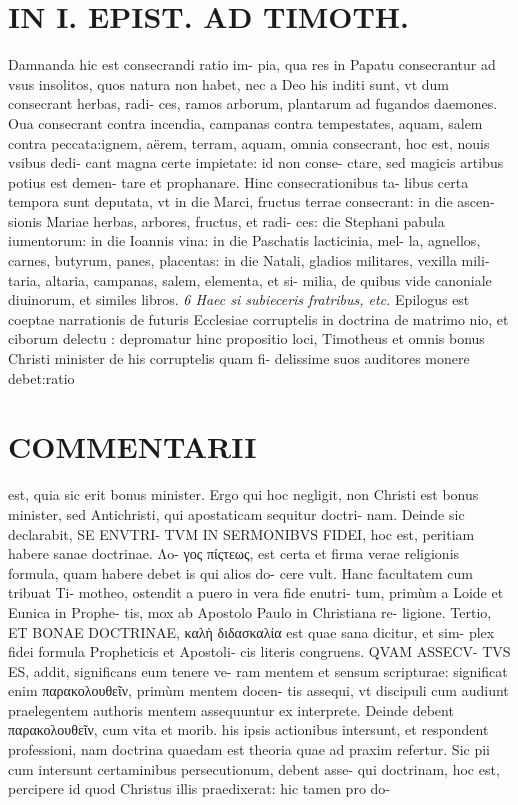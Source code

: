 \documentclass{article}
\begin{document}
\begin{pages}
\section*{IN I. EPIST. AD TIMOTH. }
\marginpar{[ p.93 ]}\pstart Damnanda hic est consecrandi ratio im- pia, qua res in Papatu consecrantur ad vsus insolitos, quos natura non habet, nec a Deo his inditi sunt, vt dum consecrant herbas, radi- ces, ramos arborum, plantarum ad fugandos daemones. Oua consecrant contra incendia, campanas contra tempestates, aquam, salem contra peccata:ignem, aërem, terram, aquam, omnia consecrant, hoc est, nouis vsibus dedi- cant magna certe impietate: id non conse- ctare, sed magicis artibus potius est demen- tare et prophanare. Hinc consecrationibus ta- libus certa tempora sunt deputata, vt in die Marci, fructus terrae consecrant: in die ascen- sionis Mariae herbas, arbores, fructus, et radi- ces: die Stephani pabula iumentorum: in die Ioannis vina: in die Paschatis lacticinia, mel- la, agnellos, carnes, butyrum, panes, placentas: in die Natali, gladios militares, vexilla mili- taria, altaria, campanas, salem, elementa, et si- milia, de quibus vide canoniale diuinorum, et similes libros.  \pend
\textit{6 Haec si subieceris fratribus, etc. }\pstart Epilogus est coeptae narrationis de futuris Ecclesiae corruptelis in doctrina de matrimo nio, et ciborum delectu : depromatur hinc propositio loci, Timotheus et omnis bonus Christi minister de his corruptelis quam fi- delissime suos auditores monere debet:ratio  \pend
\marginpar{[ p.94 ]}
\section*{COMMENTARII }\pstart est, quia sic erit bonus minister. Ergo qui hoc negligit, non Christi est bonus minister, sed Antichristi, qui apostaticam sequitur doctri- nam. Deinde sic declarabit, SE ENVTRI- TVM IN SERMONIBVS FIDEI, hoc est, peritiam habere sanae doctrinae. Λo- γος πίςτεως, est certa et firma verae religionis formula, quam habere debet is qui alios do- cere vult. Hanc facultatem cum tribuat Ti- motheo, ostendit a puero in vera fide enutri- tum, primùm a Loide et Eunica in Prophe- tis, mox ab Apostolo Paulo in Christiana re- ligione.  \pend\pstart Tertio, ET BONAE DOCTRINAE, καλὴ διδασκαλία est quae sana dicitur, et sim- plex fidei formula Propheticis et Apostoli- cis literis congruens. QVAM ASSECV- TVS ES, addit, significans eum tenere ve- ram mentem et sensum scripturae: significat enim παρακολουθεῖν, primùm mentem docen- tis assequi, vt discipuli cum audiunt praelegentem authoris mentem assequuntur ex interprete. Deinde debent παρακολουθεῖν, cum vita et morib. his ipsis actionibus intersunt, et respondent professioni, nam doctrina quaedam est theoria quae ad praxim refertur. Sic pii cum intersunt certaminibus persecutionum, debent asse- qui doctrinam, hoc est, percipere id quod Christus illis praedixerat: hic tamen pro do-  \pend

\end{pages}
\end{document}
